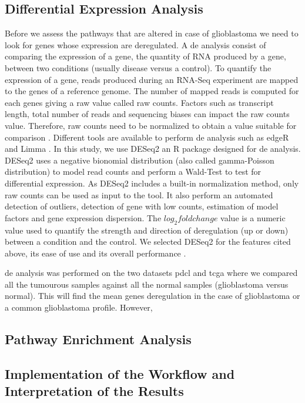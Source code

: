 \subsection{Differential Expression Analysis}

Before we assess the pathways that are altered in case of glioblastoma we need to look for genes whose expression are deregulated.
A \acrfull{de} analysis consist of comparing the expression of a gene, the quantity of RNA produced by a gene, between two conditions (usually disease versus a control).
To quantify the expression of a gene, reads produced during an RNA-Seq experiment are mapped to the genes of a reference genome.
The number of mapped reads is computed for each genes giving a raw value called raw counts.
Factors such as transcript length, total number of reads and sequencing biases can impact the raw counts value. 
Therefore, raw counts need to be normalized to obtain a value suitable for comparison \cite*{Conesa2016}.
Different tools are available to perform \acrshort{de} analysis such as edgeR \cite*{Robinson2010} and Limma \cite*{Ritchie2015}.
In this study, we use DESeq2 \cite*{Love2014} an R package designed for \acrshort{de} analysis.
DESeq2 uses a negative bionomial distribution (also called gamma-Poisson distribution) to model read counts and perform a Wald-Test to test for differential expression.
As DESeq2 includes a built-in normalization method, only raw counts can be used as input to the tool.
It also perform an automated detection of outliers, detection of gene with low counts, estimation of model factors and gene expression dispersion.
The $log_2 fold change$ value is a numeric value used to quantify the strength and direction of deregulation (up or down) between a condition and the control.
We selected DESeq2 for the features cited above, its ease of use and its overall performance \cite*{Love2014}.

\acrshort{de} analysis was performed on the two datasets \acrshort{pdcl} and \acrshort{tcga} where we compared all the tumourous samples against all the normal samples (glioblastoma versus normal).
This will find the mean genes deregulation in the case of glioblastoma or a common glioblastoma profile.
However, 

\subsection{Pathway Enrichment Analysis}

\subsection{Implementation of the Workflow and Interpretation of the Results}


